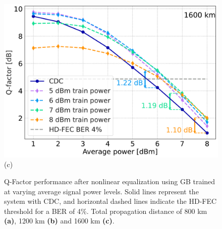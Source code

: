 \begin{figure}[ht]
{\begin{minipage}[h]{0.49\linewidth}
{            \includegraphics[width=1\linewidth]{images/boost/q_different_models_single_1600.pdf} (c) \\
        }
        \end{minipage}
    }
    \caption{Q-Factor performance after nonlinear equalization using GB trained at varying average signal power levels. Solid lines represent the system with CDC, and horizontal dashed lines indicate the HD-FEC threshold for a BER of 4\%. Total propagation distance of 800 km \textbf{(a)}, 1200 km \textbf{(b)} and 1600 km \textbf{(c)}.}
    \label{fig:boost_result}
\end{figure}





